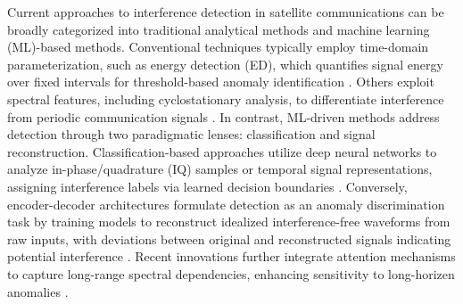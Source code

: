 \documentclass[conference]{IEEEtran}
\begin{document}
Current approaches to interference detection in satellite communications can be broadly categorized into traditional analytical methods and machine learning (ML)-based methods. Conventional techniques typically employ time-domain parameterization, such as energy detection (ED), which quantifies signal energy over fixed intervals for threshold-based anomaly identification \cite{kay2009fundamentals}. Others exploit spectral features, including cyclostationary analysis, to differentiate interference from periodic communication signals \cite{experimentalCyclostationary}. In contrast, ML-driven methods address detection through two paradigmatic lenses: classification and signal reconstruction. Classification-based approaches utilize deep neural networks to analyze in-phase/quadrature (IQ) samples or temporal signal representations, assigning interference labels via learned decision boundaries \cite{pellacoSpectrumPredictionInterference2019}. Conversely, encoder-decoder architectures formulate detection as an anomaly discrimination task by training models to reconstruct idealized interference-free waveforms from raw inputs, with deviations between original and reconstructed signals indicating potential interference \cite{saifaldawlaConvolutionalAutoencodersNonGeostationary2024}. Recent innovations further integrate attention mechanisms to capture long-range spectral dependencies, enhancing sensitivity to long-horizen anomalies \cite{saifaldawlaGenAIBasedModelsNGSO2024}. 






\end{document}
